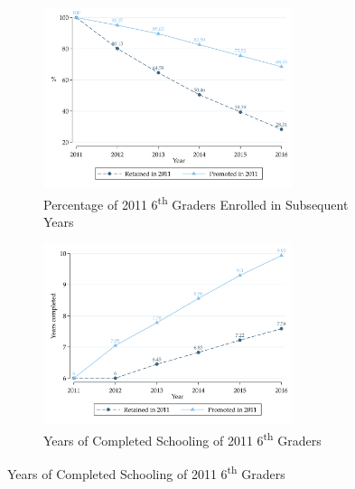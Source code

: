 \documentclass[11pt,a4paper]{article}
\begin{document}
	\begin{figure}[ht!]
		\caption{6\textsuperscript{th} Grade Retention and Student Attainment}
		\captionsetup[subfigure]{position=top,justification=centering}
		\label{fig:retention_grade6}
		\centering
		
		\begin{subfigure}{\textwidth}
			\caption{Percentage of 2011 6\textsuperscript{th} Graders Enrolled in Subsequent Years}
			\label{fig:retention_grade6_dropout}
			\centering
			\includegraphics[width=0.8\textwidth]{DataWork/Output/Figures/fig5a-retention_grade6_dropout.png}
		\end{subfigure} 
		
		\begin{subfigure}{\textwidth}
			\caption{Years of Completed Schooling of 2011 6\textsuperscript{th} Graders}
			\label{fig:retention_grade6_education}
			\centering
			\includegraphics[width=0.8\textwidth]{DataWork/Output/Figures/fig5b-retention_grade6_education.png}
		\end{subfigure}  
		

\end{figure}
\end{document}
